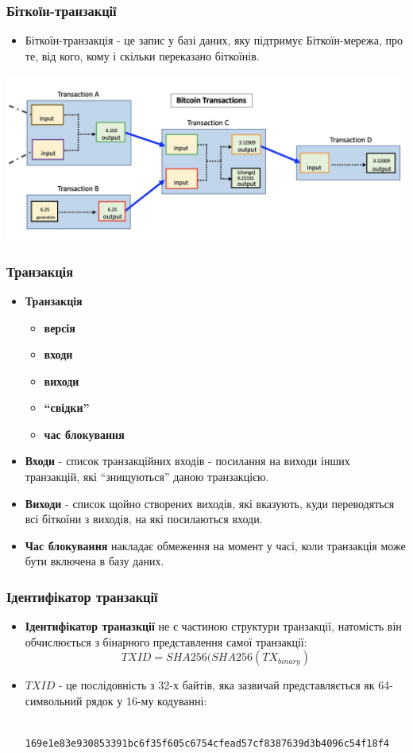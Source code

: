 \documentclass{beamer}
\begin{document}
\begin{frame}
  \frametitle{Біткоїн-транзакції}
  \begin{itemize}
  \item Біткоїн-транзакція - це запис у базі даних, яку підтримує
    Біткоїн-мережа, про те, від кого, кому і скільки переказано біткоїнів.
  \end{itemize}
  \includegraphics[width=\textwidth]{tx}
\end{frame}

\begin{frame}
  \frametitle{Транзакція}
  \begin{itemize}
  \item \textbf{Транзакція}
    \begin{itemize}
    \item \textbf{версія}
    \item \textbf{входи}
    \item \textbf{виходи}
    \item \textbf{``свідки''}
    \item \textbf{час блокування}
    \end{itemize}
  \item \textbf{Входи} - список транзакційних входів - посилання на виходи інших
    транзакцій, які ``знищуються'' даною транзакцією.
  \item \textbf{Виходи} - список щойно створених виходів, які вказують, куди
    переводяться всі біткоїни з виходів, на які посилаються входи.
  \item \textbf{Час блокування} накладає обмеження на момент у часі, коли
    транзакція може бути включена в базу даних.
  \end{itemize}
\end{frame}

\begin{frame}[fragile]
  \frametitle{Ідентифікатор транзакції}
  \begin{itemize}
  \item \textbf{Ідентифікатор траназкції} не є частиною структури транзакції,
    натомість він обчислюється з бінарного представлення самої транзакції:
    $$TXID = SHA256(SHA256(TX_{binary})$$
  \item $TXID$ - це послідовність з 32-х байтів, яка зазвичай представляється як
    64-символьний рядок у 16-му кодуванні:
    \begin{verbatim}
      169e1e83e930853391bc6f35f605c6754cfead57cf8387639d3b4096c54f18f4
    \end{verbatim}
  \end{itemize}
\end{frame}
\end{document}
